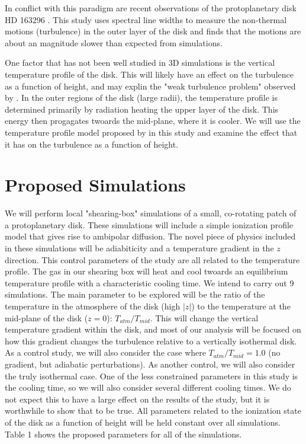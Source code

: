 \documentclass[preprint]{aastex}
\begin{document}
In conflict with this paradigm are recent observations of the protoplanetary disk HD 163296 \citep{Flaherty15}.  This study uses spectral line widths to measure the non-thermal motions (turbulence) in the outer layer of the disk and finds that the motions are about an magnitude slower than expected from simulations.  

One factor that has not been well studied in 3D simulations is the vertical temperature profile of the disk.  This will likely have an effect on the turbulence as a function of height, and may explin the "weak turbulence problem" observed by \cite{Flaherty15}.  In the outer regions of the disk (large radii), the temperature profile is determined primarily by radiation heating the upper layer of the disk.  This energy then progagates twoards the mid-plane, where it is cooler.  We will use the temperature profile model proposed by \citep{temperatureProfile} in this study and examine the effect that it has on the turbulence as a function of height.              

\vspace{-8mm}
\section{Proposed Simulations}
\vspace{-2mm}

We will perform local "shearing-box" simulations of a small, co-rotating patch of a protoplanetary disk.  These simulations will include a simple ionization profile model that gives rise to ambipolar diffusion.  The novel piece of physics included in these simulations will be adiabiticity and a temperature gradient in the $z$ direction.  This control parameters of the study are all related to the temperature profile.  The gas in our shearing box will heat and cool twoards an equilibrium temperature profile \citep{temperatureProfile} with a characteristic cooling time.  We intend to carry out 9 simulations.  The main parameter to be explored will be the ratio of the temperature in the atmosphere of the disk (high $|z|$) to the temperature at the mid-plane of the disk ($z=0$): $T_{atm}/T_{mid}$.  This will change the vertical temperature gradient within the disk, and most of our analysis will be focused on how this gradient changes the turbulence relative to a vertically isothermal disk.  As a control study, we will also consider the case where $T_{atm}/T_{mid}=1.0$ (no gradient, but adiabatic perturbations).  As another control, we will also consider the truly isothermal case.  One of the less constrained parameters in this study is the cooling time, so we will also consider several different cooling times.  We do not expect this to have a large effect on the results of the study, but it is worthwhile to show that to be true.  All parameters related to the ionization state of the disk as a function of height will be held constant over all simulations.  Table 1 shows the proposed parameters for all of the simulations.  
\end{document}
